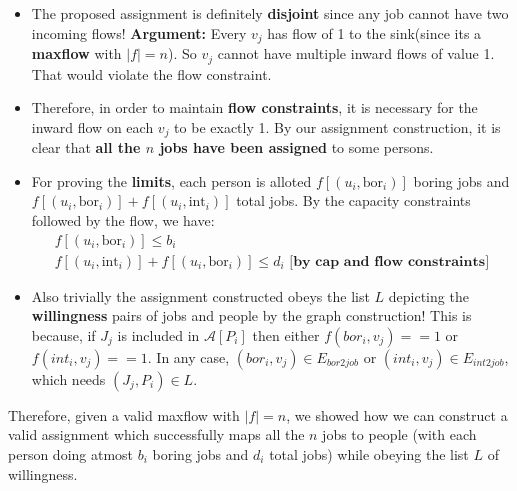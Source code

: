 \documentclass[11pt, fleqn]{article}
\begin{document}
\begin{itemize}
    \begin{itemize}
        \item The proposed assignment is definitely \textbf{disjoint} since any job cannot have two incoming flows! \textbf{Argument: } Every $v_j$ has flow of 1 to the sink(since its a \textbf{maxflow} with $|f|=n$). So $v_j$ cannot have multiple inward flows of value 1. That would violate the flow constraint.
        
        \item Therefore, in order to maintain \textbf{flow constraints}, it is necessary for the inward flow on each $v_j$ to be exactly 1. By our assignment construction, it is clear that \textbf{all the $n$ jobs have been assigned} to some persons.
        
        \item For proving the \textbf{limits}, each person is alloted $f[(u_i,\text{bor}_i)]$ boring jobs and $f[(u_i,\text{bor}_i)] + f[(u_i,\text{int}_i)]$ total jobs. By the capacity constraints followed by the flow, we have: 
        \begin{equation*}
            \begin{gathered}
                f[(u_i,\text{bor}_i)] \leq b_i\\
                f[(u_i,\text{int}_i)] + f[(u_i,\text{bor}_i)] \leq d_i \textbf{ [by cap and flow constraints]}
            \end{gathered}
        \end{equation*}
        
        \item Also trivially the assignment constructed obeys the list $L$ depicting the \textbf{willingness} pairs of jobs and people by the graph construction! This is because, if $J_j$ is included in $\mathcal{A}[P_i]$ then either $f(bor_i,v_j)==1$ or $f(int_i,v_j)==1$. In any case, $(bor_i,v_j) \in E_{bor2job}$ or $(int_i,v_j) \in E_{int2job}$, which needs $(J_j,P_i) \in L$.
    \end{itemize}
    
    Therefore, given a valid maxflow with $|f|=n$, we showed how we can construct a valid assignment which successfully maps all the $n$ jobs to people (with each person doing atmost $b_i$ boring jobs and $d_i$ total jobs) while obeying the list $L$ of willingness.
\end{itemize}
\end{document}
